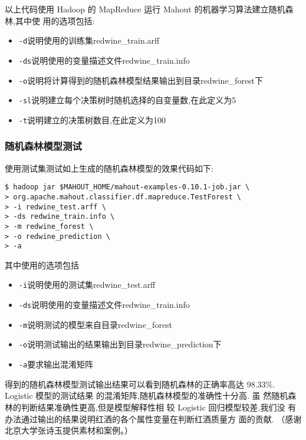 以上代码使用 Hadoop 的 MapReduce 运行 Mahout
的机器学习算法建立随机森林,其中使 用的选项包括:

\begin{itemize}
\item
  \lstinline!-d!说明使用的训练集redwine\_train.arff
\item
  \lstinline!-ds!说明使用的变量描述文件redwine\_train.info
\item
  \lstinline!-o!说明将计算得到的随机森林模型结果输出到目录redwine\_forest下
\item
  \lstinline!-sl!说明建立每个决策树时随机选择的自变量数,在此定义为5
\item
  \lstinline!-t!说明建立的决策树数目,在此定义为100
\end{itemize}

\subsubsection{随机森林模型测试}\label{ux968fux673aux68eeux6797ux6a21ux578bux6d4bux8bd5}

使用测试集测试如上生成的随机森林模型的效果代码如下:

\begin{lstlisting}
$ hadoop jar $MAHOUT_HOME/mahout-examples-0.10.1-job.jar \
> org.apache.mahout.classifier.df.mapreduce.TestForest \
> -i redwine_test.arff \
> -ds redwine_train.info \
> -m redwine_forest \
> -o redwine_prediction \
> -a
\end{lstlisting}

其中使用的选项包括

\begin{itemize}
\item
  \lstinline!-i!说明使用的测试集redwine\_test.arff
\item
  \lstinline!-ds!说明使用的变量描述文件redwine\_train.info
\item
  \lstinline!-m!说明测试的模型来自目录redwine\_forest
\item
  \lstinline!-o!说明测试输出的结果输出到目录redwine\_prediction下
\item
  \lstinline!-a!要求输出混淆矩阵
\end{itemize}

得到的随机森林模型测试输出结果可以看到随机森林的正确率高达 98.33\%.
Logistic 模型的测试结果 的混淆矩阵,随机森林模型的准确性十分高. 虽
然随机森林的判断结果准确性更高,但是模型解释性相 较 Logistic
回归模型较差,我们没
有办法通过输出的结果说明红酒的各个属性变量在判断红酒质量方 面的贡献.
（感谢北京大学张诗玉提供素材和案例。）
